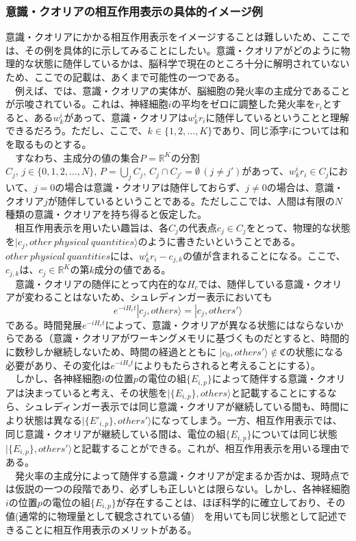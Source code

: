 \subsubsection{意識・クオリアの相互作用表示の具体的イメージ例}
意識・クオリアにかかる相互作用表示をイメージすることは難しいため、ここでは、その例を具体的に示してみることにしたい。意識・クオリアがどのように物理的な状態に随伴しているかは、脳科学で現在のところ十分に解明されていないため、ここでの記載は、あくまで可能性の一つである。\\
　例えば、\cite{Murray_2016}では、意識・クオリアの実体が、脳細胞の発火率の主成分であることが示唆されている。これは、神経細胞$i$の平均をゼロに調整した発火率を$r_i$とすると、ある$w_k^i$があって、意識・クオリアは$w_k^ir_i$に随伴しているということと理解できるだろう。ただし、ここで、$k\in\{1,2,\ldots,K\}$であり、同じ添字$i$については和を取るものとする。\\
　すなわち、主成分の値の集合$P=\mathbb{R}^K$の分割$C_j,\,j\in\{0,1,2,\ldots,N\},\, P=\bigcup_j C_j,\, C_j \cap C_{j'}=\emptyset \, (j \neq j')$があって、$w_k^ir_i \in C_j$において、$j=0$の場合は意識・クオリアは随伴しておらず、$j \neq 0$の場合は、意識・クオリア$j$が随伴しているということである。ただしここでは、人間は有限の$N$種類の意識・クオリアを持ち得ると仮定した。\\
　相互作用表示を用いたい趣旨は、各$C_j$の代表点$c_j \in C_j$をとって、物理的な状態を$|c_j,other \ physical \ quantities \rangle$のように書きたいということである。$other \ physical \  quantities$には、$w_k^ir_i - c_{j,k}$の値が含まれることになる。ここで、$c_{j,k}$は、$c_j \in \mathbb{R}^K$の第$k$成分の値である。\\
　意識・クオリアの随伴にとって内在的な$H_c$では、随伴している意識・クオリアが変わることはないため、シュレディンガー表示においても
\begin{equation}
  e^{-iH_ct}|c_j,others \rangle = |c_j,others' \rangle 
\end{equation}
である。時間発展$e^{-iH_ct}$によって、意識・クオリアが異なる状態にはならないからである（意識・クオリアがワーキングメモリに基づくものだとすると、時間的に数秒しか継続しないため、時間の経過とともに $|c_0,others' \rangle \notin \mathfrak{C}$の状態になる必要があり、その変化は$e^{-iH_ot}$によりもたらされると考えることにする）。\\
　しかし、各神経細胞$i$の位置$p$の電位の組$\{E_{i,p}\}$によって随伴する意識・クオリアは決まっていると考え、その状態を$|\{ E_{i,p}\},others \rangle$と記載することにするなら、シュレディンガー表示では同じ意識・クオリアが継続している間も、時間により状態は異なる$|\{ E'_{i,p}\},others' \rangle$になってしまう。一方、相互作用表示では、同じ意識・クオリアが継続している間は、電位の組$\{E_{i,p}\}$については同じ状態$|\{ E_{i,p}\},others' \rangle$と記載することができる。これが、相互作用表示を用いる理由である。\\
　発火率の主成分によって随伴する意識・クオリアが定まるか否かは、現時点では仮説の一つの段階であり、必ずしも正しいとは限らない。しかし、各神経細胞$i$の位置$p$の電位の組$\{E_{i,p}\}$が存在することは、ほぼ科学的に確立しており、その値(通常的に物理量として観念されている値)　を用いても同じ状態として記述できることに相互作用表示のメリットがある。